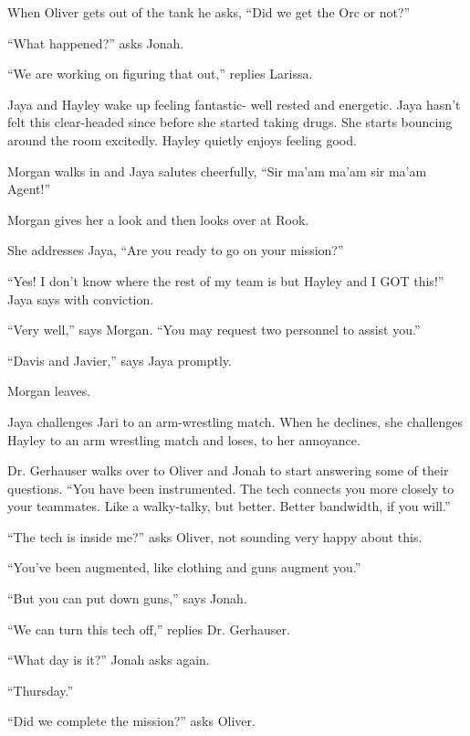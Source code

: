  

When Oliver gets out of the tank he asks, ``Did we get the Orc or not?''

``What happened?'' asks Jonah.

``We are working on figuring that out,'' replies Larissa.



Jaya and Hayley wake up feeling fantastic- well rested and energetic.  Jaya hasn't felt this clear-headed since before she started taking drugs.  She starts bouncing around the room excitedly.  Hayley quietly enjoys feeling good.



Morgan walks in and Jaya salutes cheerfully, ``Sir ma'am ma'am sir ma'am Agent!''

Morgan gives her a look and then looks over at Rook.

She addresses Jaya, ``Are you ready to go on your mission?''

``Yes!  I don't know where the rest of my team is but Hayley and I GOT this!'' Jaya says with conviction.

``Very well,'' says Morgan.  ``You may request two personnel to assist you.''

``Davis and Javier,'' says Jaya promptly.

Morgan leaves.

Jaya challenges Jari to an arm-wrestling match.  When he declines, she challenges Hayley to an arm wrestling match and loses, to her annoyance.



Dr. Gerhauser walks over to Oliver and Jonah to start answering some of their questions.  ``You have been instrumented.  The tech connects you more closely to your teammates.  Like a walky-talky, but better.  Better bandwidth, if you will.''

``The tech is inside me?'' asks Oliver, not sounding very happy about this.

``You've been augmented, like clothing and guns augment you.''

``But you can put down guns,'' says Jonah.

``We can turn this tech off,'' replies Dr. Gerhauser.



``What day is it?'' Jonah asks again.

``Thursday.''

``Did we complete the mission?'' asks Oliver.

